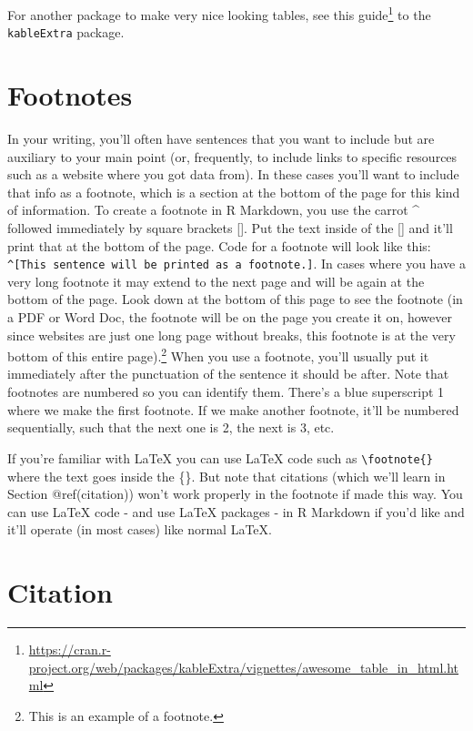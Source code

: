 \documentclass[
  a4paper,
]{krantz}
\renewcommand{\href}[2]{#2\footnote{\url{#1}}}
\begin{document}
For another package to make very nice looking tables, see
\href{https://cran.r-project.org/web/packages/kableExtra/vignettes/awesome_table_in_html.html}{this
guide} to the \texttt{kableExtra} package.

\hypertarget{footnotes}{%
\section{Footnotes}\label{footnotes}}

In your writing, you'll often have sentences that you want
to include but are auxiliary to your main point (or,
frequently, to include links to specific resources such as a
website where you got data from). In these cases you'll want
to include that info as a footnote, which is a section at
the bottom of the page for this kind of information. To
create a footnote in R Markdown, you use the carrot \^{}
followed immediately by square brackets {[}{]}. Put the text
inside of the {[}{]} and it'll print that at the bottom of
the page. Code for a footnote will look like this:
\texttt{\^{}{[}This\ sentence\ will\ be\ printed\ as\ a\ footnote.{]}}.
In cases where you have a very long footnote it may extend
to the next page and will be again at the bottom of the
page. Look down at the bottom of this page to see the
footnote (in a PDF or Word Doc, the footnote will be on the
page you create it on, however since websites are just one
long page without breaks, this footnote is at the very
bottom of this entire page).\footnote{This is an example of
  a footnote.} When you use a footnote, you'll usually put
it immediately after the punctuation of the sentence it
should be after. Note that footnotes are numbered so you can
identify them. There's a blue superscript 1 where we make
the first footnote. If we make another footnote, it'll be
numbered sequentially, such that the next one is 2, the next
is 3, etc.

If you're familiar with LaTeX you can use LaTeX code such as
\texttt{\textbackslash{}footnote\{\}} where the text goes
inside the \{\}. But note that citations (which we'll learn
in Section @ref(citation)) won't work properly in the
footnote if made this way. You can use LaTeX code - and use
LaTeX packages - in R Markdown if you'd like and it'll
operate (in most cases) like normal LaTeX.

\hypertarget{citation}{%
\section{Citation}\label{citation}}
\end{document}
